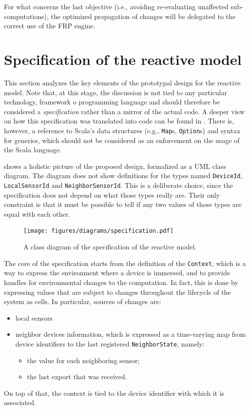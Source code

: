 For what concerns the last objective (i.e., avoiding re-evaluating unaffected sub-computations), the optimized propagation of changes will be delegated to the correct use of the FRP engine.

\section{Specification of the reactive model}
\label{sec:specification}

This section analyzes the key elements of the prototypal design for the reactive model.
%
Note that, at this stage, the discussion is not tied to any particular technology, framework o programming language and should therefore be considered a \textit{specification} rather than a mirror of the actual code.
%
A deeper view on how this specification was translated into code can be found in .
% 
There is, however, a reference to Scala's data structures (e.g., \texttt{Map}s, \texttt{Option}s) and syntax for generics, which should not be considered as an enforcement on the usage of the Scala language.

 shows a holistic picture of the proposed design, formalized as a UML class diagram.
%
The diagram does not show definitions for the types named \texttt{DeviceId}, \texttt{LocalSensorId} and \texttt{NeighborSensorId}.
%
This is a deliberate choice, since the specification does not depend on what those types really are.
%
Their only constraint is that it must be possible to tell if any two values of those types are equal with each other.
%
\begin{figure}
    \centering
    \texttt{[image: figures/diagrams/specification.pdf]}
    \caption{A class diagram of the specification of the reactive model.}
    \label{fig:class-diagram}
\end{figure}

The core of the specification starts from the definition of the \texttt{Context}, which is a way to express the environment where a device is immersed, and to provide handles for environmental changes to the computation.
%
In fact, this is done by expressing values that are subject to changes throughout the lifecycle of the system as cells.
%
In particular, sources of changes are:
%
\begin{itemize}
    \item local sensors
    \item neighbor devices information, which is expressed as a time-varying map from device identifiers to the last registered \texttt{NeighborState}, namely:
    \begin{itemize}
        \item the value for each neighboring sensor;
        \item the last export that was received.
    \end{itemize}
\end{itemize}
%
On top of that, the context is tied to the device identifier with which it is associated.

